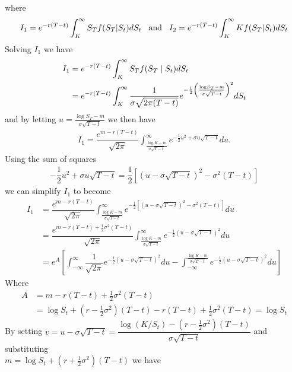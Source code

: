 where
\begin{align*}
I_1=e^{-r(T-t)} \displaystyle \int_{K}^{\infty}S_Tf(S_T| S_t)dS_t \hspace{0.3cm} \textnormal{and} \hspace{0.3cm} I_2=e^{-r(T-t)} \displaystyle \int_{K}^{\infty}Kf(S_T| S_t)dS_t
\end{align*}
Solving $I_1$ we have 
\begin{align*}
I_1 &=e^{-r(T-t)} \displaystyle \int_{K}^{\infty}S_Tf(S_T\mid S_t)dS_t\\
	&=e^{-r(T-t)} \displaystyle \int_{K}^{\infty}\dfrac{1}{\sigma\sqrt{2\pi(T-t)}}e^{-\frac{1}{2}\left(\frac{\textnormal{log}S_T-m}{\sigma\sqrt{T-t}}\right)^2}dS_t
\end{align*}
and by letting $u=\frac{\log S_T-m}{\sigma\sqrt{T-t}}$ we then have
\begin{align*}
	I_1=\dfrac{e^{m-r(T-t)}}{\sqrt{2\pi}}\displaystyle \int_{\frac{\log K-m}{\sigma\sqrt{T-t}}}^{\infty}e^{-\frac{1}{2}u^2+\sigma u\sqrt{T-t}}du.
\end{align*}
Using the sum of squares
\begin{align*}
	-\dfrac{1}{2}u^2+\sigma u\sqrt{T-t}=\dfrac{1}{2}\left[(u-\sigma\sqrt{T-t})^2-\sigma^2(T-t)\right]
\end{align*}
we can simplify $I_1$ to become
\begin{align*}
I_1&=\dfrac{e^{m-r(T-t)}}{\sqrt{2\pi}}\displaystyle \int_{\frac{\log K-m}{\sigma\sqrt{T-t}}}^{\infty}e^{-\frac{1}{2}\left[(u-\sigma\sqrt{T-t})^2-\sigma^2(T-t)\right]}du\\
&=\dfrac{e^{m-r(T-t)+\frac{1}{2}\sigma^2(T-t)}}{\sqrt{2\pi}}\displaystyle\int_{\frac{\log K-m}{\sigma\sqrt{T-t}}}^{\infty}e^{-\frac{1}{2}\left(u-\sigma\sqrt{T-t}\right)^2}du\\
&=e^A\left[\displaystyle\int_{-\infty}^{\infty}\dfrac{1}{\sqrt{2\pi}}e^{-\frac{1}{2}\left(u-\sigma\sqrt{T-t}\right)^2}du-\displaystyle\int_{-\infty}^{\frac{\log K-m}{\sigma\sqrt{T-t}}}e^{-\frac{1}{2}\left(u-\sigma\sqrt{T-t}\right)^2}du\right]
\end{align*}
Where 
\begin{align*}
	A&=m-r(T-t)+\frac{1}{2}\sigma^2(T-t)\\
	&=\log S_t+(r-\frac{1}{2}\sigma^2)(T-t) -r(T-t)+\frac{1}{2}\sigma^2(T-t)=\log S_t
\end{align*}
By setting $v=u-\sigma\sqrt{T-t}=\dfrac{\log(K/S_t)-(r-\frac{1}{2}\sigma^2)(T-t)}{\sigma\sqrt{T-t}}$ and substituting\\ $m=\log S_t+(r+\frac{1}{2}\sigma^2)(T-t)$ we have
